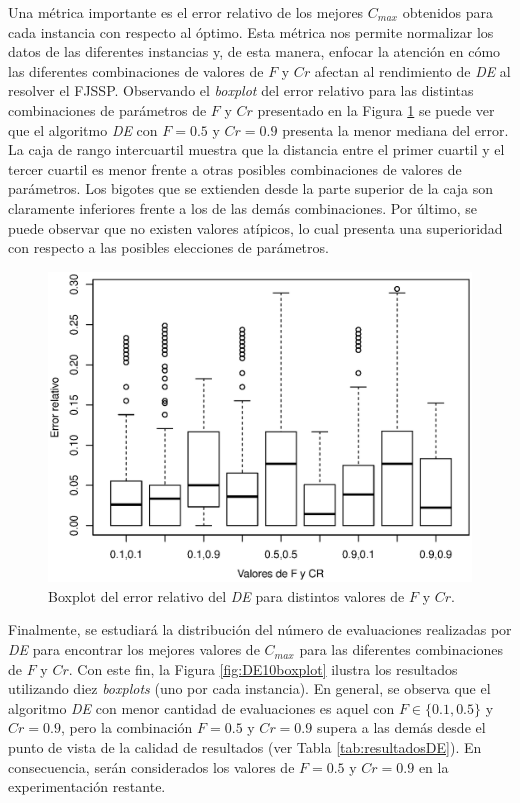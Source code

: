 Una métrica importante es el error relativo de los mejores $ C_ {max} $ obtenidos para cada instancia con respecto al óptimo. Esta métrica nos permite normalizar los datos de las diferentes instancias y, de esta manera, enfocar la atención en cómo las diferentes combinaciones de valores de $F$ y $Cr$ afectan al rendimiento de \textit{DE} al resolver el FJSSP. Observando el \textit{boxplot} del error relativo para las distintas combinaciones de parámetros de $F$ y $Cr$ presentado en la Figura \ref{fig:DEboxplot} se puede ver que el algoritmo \textit{DE} con $F = 0.5 $ y $Cr = 0.9 $ presenta la menor mediana del error. La caja de rango intercuartil muestra que la distancia entre el primer cuartil y el tercer cuartil es menor frente a otras posibles combinaciones de valores de parámetros. Los bigotes que se extienden desde la parte superior de la caja son claramente inferiores frente a los de las demás combinaciones. Por último, se puede observar que no existen valores atípicos, lo cual presenta una superioridad con respecto a las posibles elecciones de parámetros. 

\begin{figure}[H]
   \scriptsize
    \centering
    \includegraphics[trim={0 1cm 0 0.8cm},scale=0.6]{images/Boxplot-DE.eps}
    \caption{Boxplot del error relativo del \textit{DE} para distintos valores de $F$ y $Cr$.}
    \label{fig:DEboxplot}
\end{figure}


Finalmente, se estudiará la distribución del número de evaluaciones realizadas por \textit{DE} para encontrar los mejores valores de $ C_ {max} $ para las diferentes combinaciones de $F$ y $Cr$. Con este fin, la Figura \ref{fig:DE10boxplot} ilustra los resultados utilizando diez \textit{boxplots} (uno por cada instancia). En general, se observa que el algoritmo \textit{DE} con menor cantidad de evaluaciones es aquel con $F\in \{0.1,0.5\}$ y $Cr=0.9$, pero la combinación $F = 0.5 $ y $Cr = 0.9 $ supera a las demás desde el punto de vista de la calidad de resultados (ver Tabla \ref{tab:resultadosDE}). En consecuencia, serán considerados los valores de $F = 0.5 $ y $Cr = 0.9 $ en la experimentación restante.

